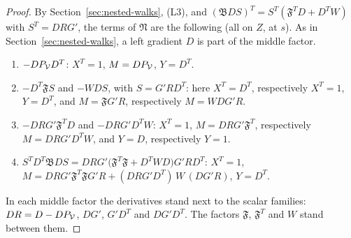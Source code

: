 \begin{proof}
By Section~\ref{sec:nested-walks}, (L3), and $(\mathfrak BDS)^T=S^T(\mathfrak F^TD+D^TW)$ with $S^T=DRG'$, the terms of $\mathfrak N$ are the following (all on $Z$, at $s$). As in Section~\ref{sec:nested-walks}, a left gradient $D$ is part of the middle factor.
\begin{enumerate}[label=(\roman*)]
\item $-DP_\mathcal V D^T$: $X^T=1$, $M=DP_\mathcal V$, $Y=D^T$.
\item $-D^T\mathfrak FS$ and $-WDS$, with $S=G'RD^T$: here $X^T=D^T$, respectively $X^T=1$, $Y=D^T$, and $M=\mathfrak FG'R$, respectively $M=WDG'R$.
\item $-DRG'\mathfrak F^TD$ and $-DRG'D^TW$: $X^T=1$, $M=DRG'\mathfrak F^T$, respectively $M=DRG'D^TW$, and $Y=D$, respectively $Y=1$.
\item $S^TD^T\mathfrak BDS=DRG'\big(\mathfrak F^T\mathfrak F+D^TWD\big)G'RD^T$: $X^T=1$, $M=DRG'\mathfrak F^T\mathfrak FG'R+(DRG'D^T)\,W\,(DG'R)$, $Y=D^T$.
\end{enumerate}
In each middle factor the derivatives stand next to the scalar families: $DR=D-DP_\mathcal V$, $DG'$, $G'D^T$ and $DG'D^T$. The factors $\mathfrak F$, $\mathfrak F^T$ and $W$ stand between them.


\end{proof}
